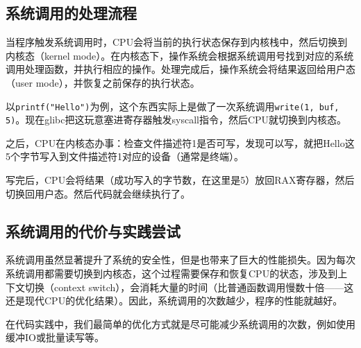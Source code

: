 \documentclass[../main.tex]{subfiles}
\begin{document}
\subsection{系统调用的处理流程}

当程序触发系统调用时，CPU会将当前的执行状态保存到内核栈中，然后切换到内核态（kernel mode）。在内核态下，操作系统会根据系统调用号找到对应的系统调用处理函数，并执行相应的操作。处理完成后，操作系统会将结果返回给用户态（user mode），并恢复之前保存的执行状态。

以\texttt{printf("Hello")}为例，这个东西实际上是做了一次系统调用\texttt{write(1, buf, 5)}。现在glibc把这玩意塞进寄存器触发syscall指令，然后CPU就切换到内核态。

之后，CPU在内核态办事：检查文件描述符1是否可写，发现可以写，就把Hello这5个字节写入到文件描述符1对应的设备（通常是终端）。

写完后，CPU会将结果（成功写入的字节数，在这里是5）放回RAX寄存器，然后切换回用户态。然后代码就会继续执行了。

\subsection{系统调用的代价与实践尝试}

系统调用虽然显著提升了系统的安全性，但是也带来了巨大的性能损失。因为每次系统调用都需要切换到内核态，这个过程需要保存和恢复CPU的状态，涉及到上下文切换（context switch），会消耗大量的时间（比普通函数调用慢数十倍——这还是现代CPU的优化结果）。因此，系统调用的次数越少，程序的性能就越好。

在代码实践中，我们最简单的优化方式就是尽可能减少系统调用的次数，例如使用缓冲IO或批量读写等。
\end{document}
